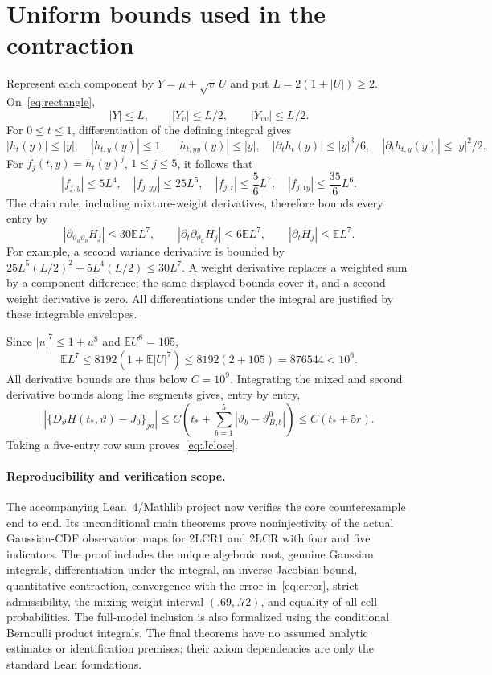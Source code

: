 \documentclass[11pt,a4paper]{article}
\numberwithin{equation}{section}
\newcommand{\E}{\mathbb E}
\newcommand{\vt}{\vartheta}
\begin{document}
\section{Uniform bounds used in the contraction}\label{app:bounds}
Represent each component by $Y=\mu+\sqrt v\,U$ and put $L=2(1+|U|)\ge2$. On~\eqref{eq:rectangle},
\[
 |Y|\le L,\qquad |Y_v|\le L/2,\qquad |Y_{vv}|\le L/2.
\]
For $0\le t\le1$, differentiation of the defining integral gives
\[
 |h_t(y)|\le|y|,\quad |h_{t,y}(y)|\le1,\quad
 |h_{t,yy}(y)|\le|y|,\quad
 |\partial_t h_t(y)|\le|y|^3/6,\quad
 |\partial_t h_{t,y}(y)|\le|y|^2/2.
\]
For $f_j(t,y)=h_t(y)^j$, $1\le j\le5$, it follows that
\[
 |f_{j,y}|\le5L^4,\quad |f_{j,yy}|\le25L^5,\quad
 |f_{j,t}|\le\frac56L^7,\quad |f_{j,ty}|\le\frac{35}6L^6.
\]
The chain rule, including mixture-weight derivatives, therefore bounds every entry by
\[
 |\partial_{\vt_a\vt_b}H_j|\le30\E L^7,\qquad
 |\partial_t\partial_{\vt_a}H_j|\le6\E L^7,\qquad
 |\partial_tH_j|\le\E L^7.
\]
For example, a second variance derivative is bounded by
$25L^5(L/2)^2+5L^4(L/2)\le30L^7$. A weight derivative replaces a weighted sum by a component difference; the same displayed bounds cover it, and a second weight derivative is zero. All differentiations under the integral are justified by these integrable envelopes.

Since $|u|^7\le1+u^8$ and $\E U^8=105$,
\[
 \E L^7\le8192(1+\E|U|^7)\le8192(2+105)=876544<10^6.
\]
All derivative bounds are thus below $C=10^9$. Integrating the mixed and second derivative bounds along line segments gives, entry by entry,
\[
 |\{D_\vt H(t_*,\vt)-J_0\}_{ja}|
 \le C\left(t_*+\sum_{b=1}^5|\vt_b-\vt_{B,b}^0|\right)
 \le C(t_*+5r).
\]
Taking a five-entry row sum proves~\eqref{eq:Jclose}.

\paragraph{Reproducibility and verification scope.}
The accompanying Lean~4/Mathlib project now verifies the core counterexample end to end. Its unconditional main theorems prove noninjectivity of the actual Gaussian-CDF observation maps for 2LCR1 and 2LCR with four and five indicators. The proof includes the unique algebraic root, genuine Gaussian integrals, differentiation under the integral, an inverse-Jacobian bound, quantitative contraction, convergence with the error in~\eqref{eq:error}, strict admissibility, the mixing-weight interval $(.69,.72)$, and equality of all cell probabilities. The full-model inclusion is also formalized using the conditional Bernoulli product integrals. The final theorems have no assumed analytic estimates or identification premises; their axiom dependencies are only the standard Lean foundations.
\end{document}
